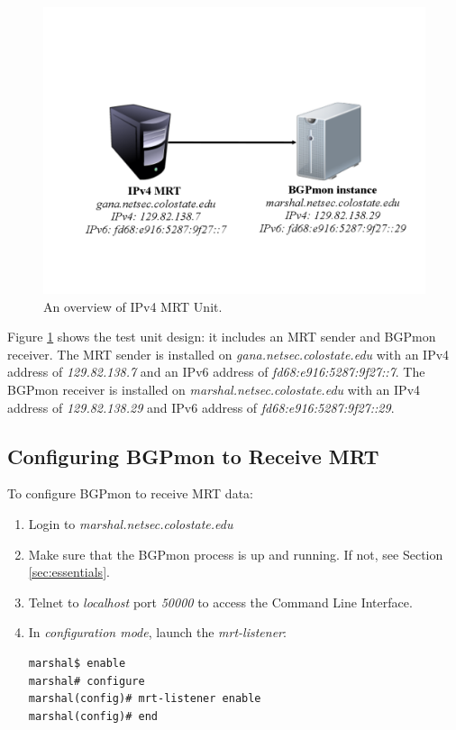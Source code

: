 \begin{figure}
\centering
\includegraphics[scale=0.30]{figs/ipv4-mrt.png}
\caption{An overview of IPv4 MRT Unit.}
\label{mrtfig}
\end{figure}

Figure \ref{mrtfig} shows the test unit design: it includes an MRT sender and BGPmon receiver.  The  MRT sender is installed on \emph{gana.netsec.colostate.edu} with an IPv4 address of  \emph{129.82.138.7} and an IPv6 address of \emph{fd68:e916:5287:9f27::7}. The BGPmon receiver is  installed on \emph{marshal.netsec.colostate.edu} with an IPv4 address of  \emph{129.82.138.29} and IPv6 address of \emph{fd68:e916:5287:9f27::29}. 

\subsection{Configuring BGPmon to Receive MRT}
\label{sec:mrtbgpmoness}


To configure BGPmon to receive MRT data: 

\begin{enumerate}
  \item{Login to \emph{marshal.netsec.colostate.edu}}
  \item{Make sure that the BGPmon process is up and running. If not, see Section \ref{sec:essentials}.}
  \item{Telnet to \emph{localhost} port \emph{50000} to access the Command Line Interface.}
  \item{In \emph{configuration mode}, launch the \emph{mrt-listener}:}
\begin{verbatim}
marshal$ enable
marshal# configure
marshal(config)# mrt-listener enable
marshal(config)# end
\end{verbatim}      
\end{enumerate}

